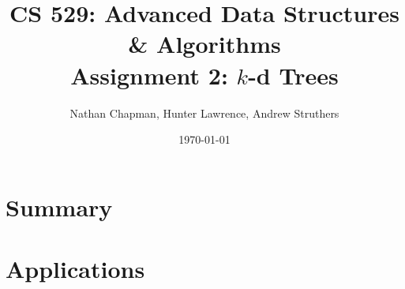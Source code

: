 \documentclass{article}
\title{\vspace*{-0.625in}CS 529: Advanced Data Structures \& Algorithms \\ Assignment 2: $k$-d Trees}
\author{Nathan Chapman, Hunter Lawrence, Andrew Struthers}
\date{\today}
\begin{document}
    \maketitle

    \section*{Summary}

        

    \section*{Applications}
\end{document}
